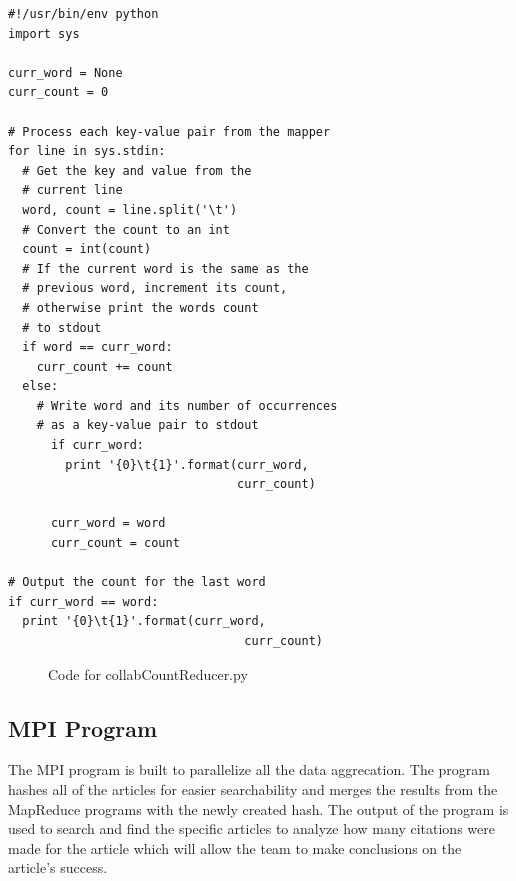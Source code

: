 \documentclass[10pt,journal,compsoc]{IEEEtran}
\begin{document}
\begin{verbatim}
#!/usr/bin/env python
import sys

curr_word = None
curr_count = 0

# Process each key-value pair from the mapper
for line in sys.stdin:
  # Get the key and value from the 
  # current line
  word, count = line.split('\t')
  # Convert the count to an int
  count = int(count)
  # If the current word is the same as the 
  # previous word, increment its count, 
  # otherwise print the words count
  # to stdout
  if word == curr_word:
    curr_count += count
  else:
    # Write word and its number of occurrences
    # as a key-value pair to stdout
      if curr_word:
        print '{0}\t{1}'.format(curr_word, 
                                curr_count)

      curr_word = word
      curr_count = count

# Output the count for the last word
if curr_word == word:
  print '{0}\t{1}'.format(curr_word,
                                 curr_count)
\end{verbatim}
\begin{figure}[htp]
\centering
\caption{Code for collabCountReducer.py}
\label{fig:}
\end{figure}

\subsection{MPI Program}
The MPI program is built to parallelize all the data aggrecation. The program hashes all of the articles for easier searchability and merges the results from the MapReduce programs with the newly created hash. The output of the program is used to search and find the specific articles to analyze how many citations were made for the article which will allow the team to make conclusions on the article's success.   
\end{document}
